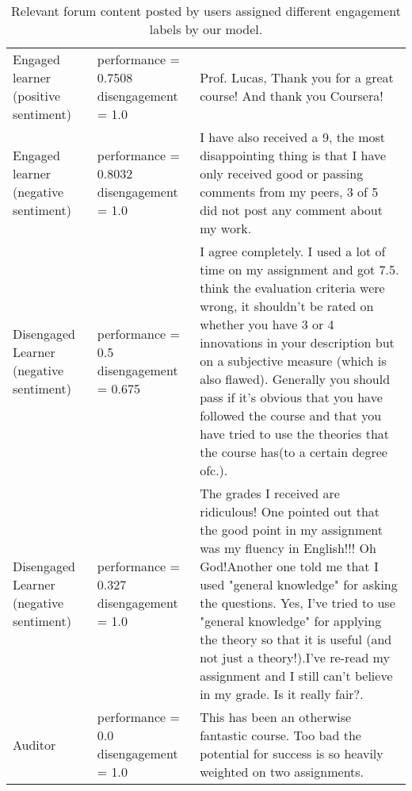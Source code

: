 \begin{table} [ht]
\begin{center}
	\begin{tabular}{ p{1.75cm}p{2cm}p{9cm} }
    \toprule
\tiny{Engaged learner \newline (positive sentiment)} & \tiny{performance = 0.7508 \newline disengagement = 1.0} & \tiny{Prof. Lucas, Thank you for a great course! And thank you Coursera!} \\
\tiny{Engaged learner \newline (negative sentiment)} & \tiny{performance = 0.8032 \newline disengagement = 1.0} & \tiny{I have also received a 9, the most disappointing thing
is that I have only received good or passing comments from my peers, 3 of 5 did
not post any comment about my work.}\\
\tiny{Disengaged Learner \newline (negative sentiment)} & \tiny{performance = 0.5 \newline disengagement = 0.675} &\tiny{I agree completely. I used a lot of time on my assignment and got 7.5.  think the evaluation criteria were wrong, it shouldn't be rated on whether you have 3 or 4 innovations in your description but on a subjective measure (which is also flawed). Generally you should pass if it's obvious that you have followed the course and that you have tried to use the theories that the course has(to a certain degree ofc.).}\\
\tiny{Disengaged Learner \newline (negative sentiment)} & \tiny{performance = 0.327 \newline disengagement = 1.0} &\tiny{The grades I received are ridiculous! One pointed out that the good point in my assignment was my fluency in English!!! Oh God!Another one told me that I used "general knowledge" for asking the questions. Yes, I've tried to use "general knowledge" for applying the theory so that it is useful (and not just a theory!).I've re-read my assignment and I still can't believe in my grade. Is it really fair?.}\\
\tiny{Auditor} & \tiny{performance = 0.0 \newline disengagement = 1.0}& \tiny{This has been an otherwise fantastic course. Too bad the potential for success is so heavily weighted on two assignments.}\\
    \bottomrule
    \end{tabular}
    \end{center}
      \caption{Relevant forum content posted by users assigned different engagement labels by our model.}
  \label{table:examples}
\end{table}
